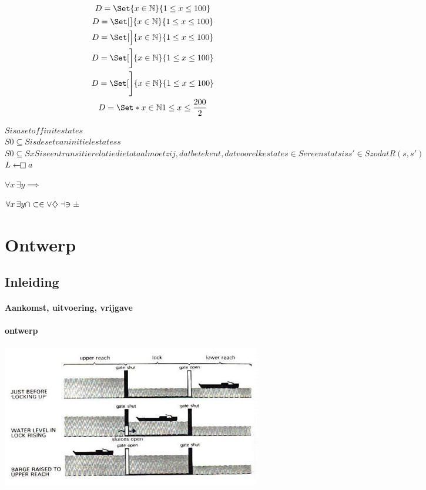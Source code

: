 \begin{center}
	\begin{gather*}
		D=\Set{x\in\nat}{1\le x\le 100}\\
		D=\Set[\big]{x\in\nat}{1\le x\le 100}\\
		D=\Set[\Big]{x\in\nat}{1\le x\le 100}\\
		D=\Set[\bigg]{x\in\nat}{1\le x\le 100}\\
		D=\Set[\Bigg]{x\in\nat}{1\le x\le 100}\\
		D=\Set*{x\in\nat}{1\le x\le \frac{200}{2}}
	\end{gather*}
\end{center}





$S is a set of finite states$\\
$S0 \subseteq S is de set van initiele statess$ \\
$S0 \subseteq S xS  is een transitie relatie die totaal moet zij, dat betekent, dat voor elke state s \in S er een stats is s' \in S zodat R(s,s')$
$L\gets\mathrel{\mkern-2.4mu\mathop\square} a$

$\forall x\,\exists y \implies $

$\forall x\,\exists y \cap \subset \in \vee \diamondsuit \dashv \ni \pm$

 
\chapter{Ontwerp}

\section{Inleiding}

\subsubsection{Aankomst, uitvoering, vrijgave}


\subsubsection{ontwerp}

\includegraphics[scale=0.65]{sluismodel.jpg}

